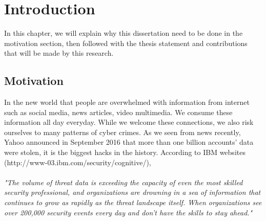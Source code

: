 \chapter{Introduction}
\thispagestyle{plain}

\label{Chapter1}

In this chapter, we will explain why this dissertation need to be done in the motivation section, then followed with the thesis statement and contributions that will be made by this research. 

\section{Motivation}
\label{motivation}
In the new world that people are overwhelmed with information from internet such as social media, news articles, video multimedia. We consume these information all day everyday. While we welcome these connections, we also risk ourselves to many patterns of cyber crimes. As we seen from news recently, Yahoo announced in September 2016 that more than one billion accounts’ data were stolen, it is the biggest hacks in the history. According to IBM websites (http://www-03.ibm.com/security/cognitive/),
\\\\
\textit{"The volume of threat data is exceeding the capacity of even the most skilled security professional, and organizations are drowning in a sea of information that continues to grow as rapidly as the threat landscape itself. When organizations see over 200,000 security events every day and don’t have the skills to stay ahead."}\\

